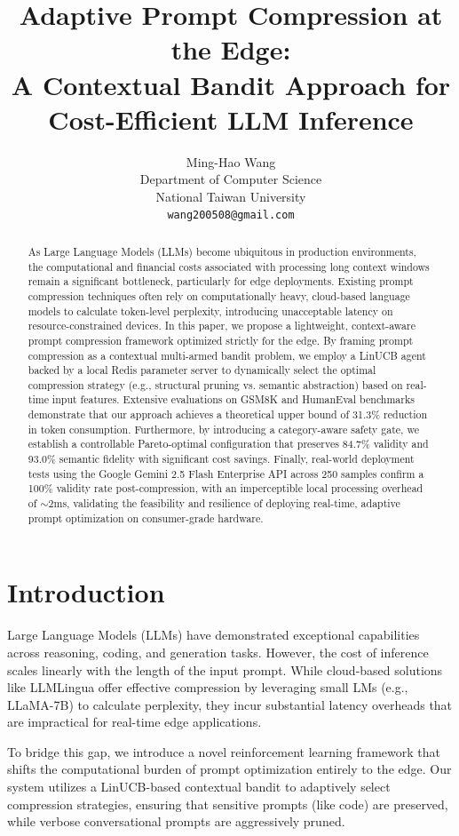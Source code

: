 \documentclass{article}
\title{Adaptive Prompt Compression at the Edge: \\ A Contextual Bandit Approach for Cost-Efficient LLM Inference}
\author{%
  Ming-Hao Wang \\
  Department of Computer Science \\
  National Taiwan University \\
  \texttt{wang200508@gmail.com} \\
}
\begin{document}
\maketitle

\begin{abstract}
As Large Language Models (LLMs) become ubiquitous in production environments, the computational and financial costs associated with processing long context windows remain a significant bottleneck, particularly for edge deployments. Existing prompt compression techniques often rely on computationally heavy, cloud-based language models to calculate token-level perplexity, introducing unacceptable latency on resource-constrained devices. In this paper, we propose a lightweight, context-aware prompt compression framework optimized strictly for the edge. By framing prompt compression as a contextual multi-armed bandit problem, we employ a LinUCB agent backed by a local Redis parameter server to dynamically select the optimal compression strategy (e.g., structural pruning vs. semantic abstraction) based on real-time input features. Extensive evaluations on GSM8K and HumanEval benchmarks demonstrate that our approach achieves a theoretical upper bound of 31.3\% reduction in token consumption. Furthermore, by introducing a category-aware safety gate, we establish a controllable Pareto-optimal configuration that preserves 84.7\% validity and 93.0\% semantic fidelity with significant cost savings. Finally, real-world deployment tests using the Google Gemini 2.5 Flash Enterprise API across 250 samples confirm a 100\% validity rate post-compression, with an imperceptible local processing overhead of $\sim$2ms, validating the feasibility and resilience of deploying real-time, adaptive prompt optimization on consumer-grade hardware.
\end{abstract}

\section{Introduction}
Large Language Models (LLMs) have demonstrated exceptional capabilities across reasoning, coding, and generation tasks. However, the cost of inference scales linearly with the length of the input prompt. While cloud-based solutions like LLMLingua offer effective compression by leveraging small LMs (e.g., LLaMA-7B) to calculate perplexity, they incur substantial latency overheads that are impractical for real-time edge applications. 

To bridge this gap, we introduce a novel reinforcement learning framework that shifts the computational burden of prompt optimization entirely to the edge. Our system utilizes a LinUCB-based contextual bandit to adaptively select compression strategies, ensuring that sensitive prompts (like code) are preserved, while verbose conversational prompts are aggressively pruned.
\end{document}

